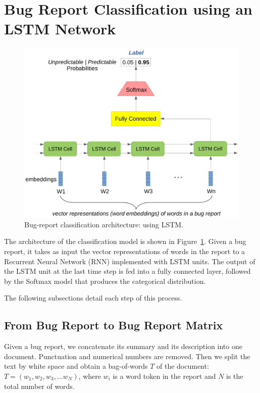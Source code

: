 \section{Bug Report Classification using an LSTM Network}
\label{sec:lstm-based classification}
\begin{figure}[t]
\centering
\includegraphics[width=\columnwidth]{figures/lstm.pdf}
\caption{Bug-report classification architecture: using LSTM.}
\label{fig:lstm}
\end{figure}
The architecture of the classification model is shown in Figure~\ref{fig:lstm}. Given a bug report, it takes as input the vector representations of words in the report to a Recurrent Neural Network (RNN) implemented with LSTM units. The output of the LSTM unit at the last time step is fed into a fully connected layer, followed by the Softmax model that produces the categorical distribution.

The following subsections detail each step of this process.

\subsection{From Bug Report to Bug Report Matrix}
\label{sec:bug report matrix}
Given a bug report, we concatenate its summary and its description into one document. Punctuation and numerical numbers are removed. Then we split the text by white space and obtain a bag-of-words $T$ of the document: $T = (w_1, w_2, w_3, ... w_N)$, where $w_i$ is a word token in the report and $N$ is the total number of words.


